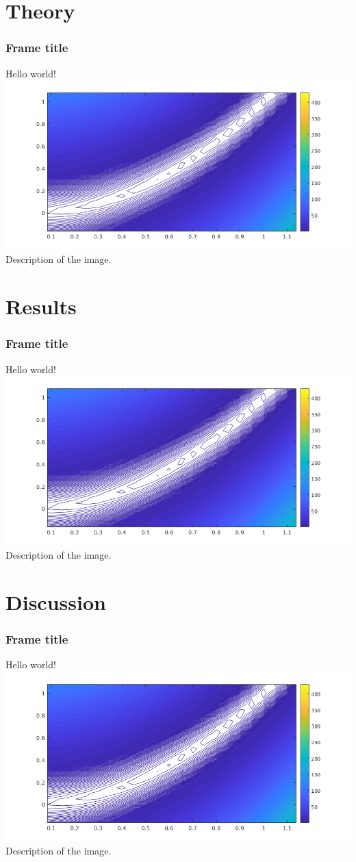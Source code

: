 \documentclass[aspectratio=169]{beamer}
\begin{document}
\section{Theory}
\begin{frame}
 \frametitle{Frame title }
 Hello world!\\
 \includegraphics[scale=0.5]{images/rosenbrockzoom.png}\\
 Description of the image.
\end{frame}

\section{Results}
\begin{frame}
 \frametitle{Frame title}
 Hello world!\\
 \includegraphics[scale=0.5]{images/rosenbrockzoom.png}\\
 Description of the image.
\end{frame}

\section{Discussion}
\begin{frame}
 \frametitle{Frame title}
 Hello world!\\
 \includegraphics[scale=0.5]{images/rosenbrockzoom.png}\\
 Description of the image.
\end{frame}
\end{document}
